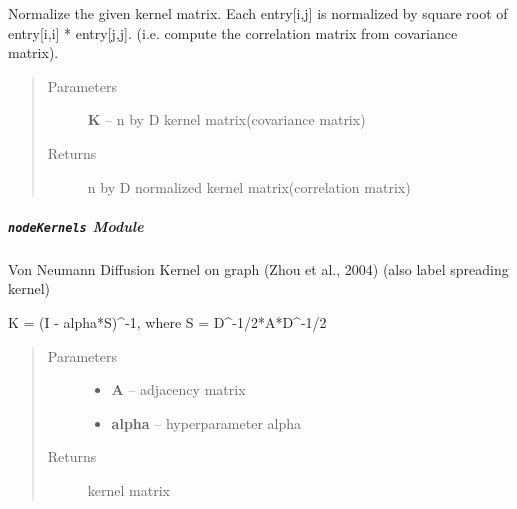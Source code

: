 \documentclass[letterpaper,10pt,english]{sphinxmanual}
\begin{document}

\begin{fulllineitems}
\label{pyGPs.GraphExtensions:pyGPs.GraphExtensions.graphUtil.normalizeKernel}
Normalize the given kernel matrix. 
Each entry{[}i,j{]} is normalized by square root of entry{[}i,i{]} * entry{[}j,j{]}.
(i.e. compute the correlation matrix from covariance matrix).
\begin{quote}\begin{description}
\item[{Parameters}] \leavevmode
\textbf{K} -- n by D kernel matrix(covariance matrix)

\item[{Returns}] \leavevmode
n by D normalized kernel matrix(correlation matrix)

\end{description}\end{quote}

\end{fulllineitems}



\subparagraph{\texttt{nodeKernels} Module}
\label{pyGPs.GraphExtensions:nodekernels-module}\label{pyGPs.GraphExtensions:module-pyGPs.GraphExtensions.nodeKernels}

\begin{fulllineitems}
\label{pyGPs.GraphExtensions:pyGPs.GraphExtensions.nodeKernels.VNDKernel}
Von Neumann Diffusion Kernel on graph (Zhou et al., 2004)
(also label spreading kernel)

K = (I - alpha*S)\textasciicircum{}-1, where S = D\textasciicircum{}-1/2*A*D\textasciicircum{}-1/2
\begin{quote}\begin{description}
\item[{Parameters}] \leavevmode\begin{itemize}
\item {} 
\textbf{A} -- adjacency matrix

\item {} 
\textbf{alpha} -- hyperparameter alpha

\end{itemize}

\item[{Returns}] \leavevmode
kernel matrix

\end{description}\end{quote}

\end{fulllineitems}
\end{document}
